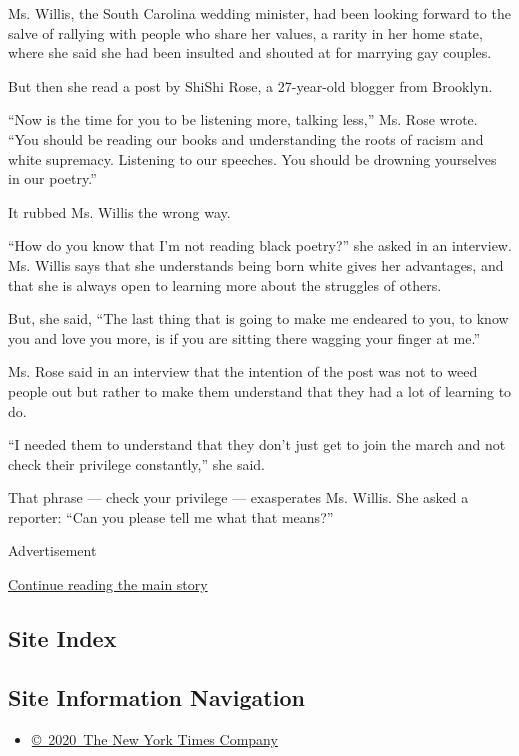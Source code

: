 Ms. Willis, the South Carolina wedding minister, had been looking
forward to the salve of rallying with people who share her values, a
rarity in her home state, where she said she had been insulted and
shouted at for marrying gay couples.

But then she read a post by ShiShi Rose, a 27-year-old blogger from
Brooklyn.

``Now is the time for you to be listening more, talking less,'' Ms. Rose
wrote. ``You should be reading our books and understanding the roots of
racism and white supremacy. Listening to our speeches. You should be
drowning yourselves in our poetry.''

It rubbed Ms. Willis the wrong way.

``How do you know that I'm not reading black poetry?'' she asked in an
interview. Ms. Willis says that she understands being born white gives
her advantages, and that she is always open to learning more about the
struggles of others.

But, she said, ``The last thing that is going to make me endeared to
you, to know you and love you more, is if you are sitting there wagging
your finger at me.''

Ms. Rose said in an interview that the intention of the post was not to
weed people out but rather to make them understand that they had a lot
of learning to do.

``I needed them to understand that they don't just get to join the march
and not check their privilege constantly,'' she said.

That phrase --- check your privilege --- exasperates Ms. Willis. She
asked a reporter: ``Can you please tell me what that means?''

Advertisement

\protect\hyperlink{after-bottom}{Continue reading the main story}

\hypertarget{site-index}{%
\subsection{Site Index}\label{site-index}}

\hypertarget{site-information-navigation}{%
\subsection{Site Information
Navigation}\label{site-information-navigation}}

\begin{itemize}
\tightlist
\item
  \href{https://help.nytimes.com/hc/en-us/articles/115014792127-Copyright-notice}{©~2020~The
  New York Times Company}
\end{itemize}


